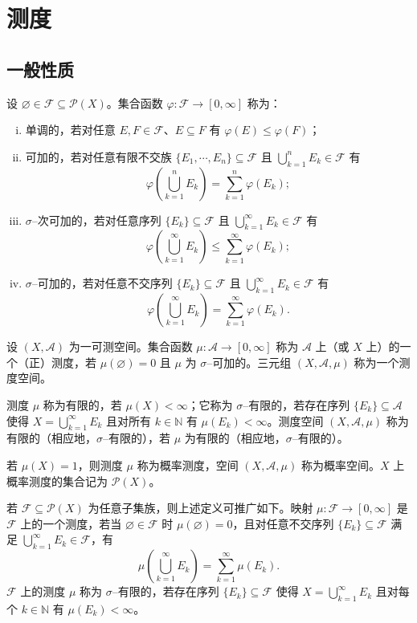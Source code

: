 \documentclass[../../main.tex]{subfiles}%
\begin{document}
\section{测度}\label{section:ch01-测度}

\subsection{一般性质}\label{subsection:ch01-测度一般性质}

\begin{definition}\label{definition:ch01-集合函数性质}
设 $\varnothing \in\mathcal{F}\subseteq\mathcal{P}(X)$。集合函数 $\varphi:\mathcal{F}\to[0,\infty]$ 称为：
\begin{enumerate}[(i)]
\item 单调的，若对任意 $E,F\in\mathcal{F}$、$E\subseteq F$ 有 $\varphi(E)\leqslant\varphi(F)$；
\item 可加的，若对任意有限不交族 $\{E_1,\cdots ,E_n\}\subseteq\mathcal{F}$ 且 $\bigcup_{k=1}^n E_k\in\mathcal{F}$ 有
\[
\varphi\left(\bigcup_{k=1}^n E_k\right)=\sum_{k=1}^n\varphi(E_k);
\]
\item $\sigma$--次可加的，若对任意序列 $\{E_k\}\subseteq\mathcal{F}$ 且 $\bigcup_{k=1}^\infty E_k\in\mathcal{F}$ 有
\[
\varphi\left(\bigcup_{k=1}^\infty E_k\right)\leqslant\sum_{k=1}^\infty\varphi(E_k);
\]
\item $\sigma$--可加的，若对任意不交序列 $\{E_k\}\subseteq\mathcal{F}$ 且 $\bigcup_{k=1}^\infty E_k\in\mathcal{F}$ 有
\[
\varphi\left(\bigcup_{k=1}^\infty E_k\right)=\sum_{k=1}^\infty\varphi(E_k).
\]
\end{enumerate}
\end{definition}

\begin{definition}\label{definition:ch01-测度}
设 $(X,\mathcal{A})$ 为一可测空间。集合函数 $\mu:\mathcal{A}\to[0,\infty]$ 称为 $\mathcal{A}$ 上（或 $X$ 上）的一个（正）测度，若 $\mu(\varnothing )=0$ 且 $\mu$ 为 $\sigma$--可加的。三元组 $(X,\mathcal{A},\mu)$ 称为一个测度空间。

测度 $\mu$ 称为有限的，若 $\mu(X)<\infty$；它称为 $\sigma$--有限的，若存在序列 $\{E_k\}\subseteq\mathcal{A}$ 使得 $X=\bigcup_{k=1}^\infty E_k$ 且对所有 $k\in\mathbb{N}$ 有 $\mu(E_k)<\infty$。测度空间 $(X,\mathcal{A},\mu)$ 称为有限的（相应地，$\sigma$--有限的），若 $\mu$ 为有限的（相应地，$\sigma$--有限的）。

若 $\mu(X)=1$，则测度 $\mu$ 称为概率测度，空间 $(X,\mathcal{A},\mu)$ 称为概率空间。$X$ 上概率测度的集合记为 $\mathcal{P}(X)$。

若 $\mathcal{F}\subseteq\mathcal{P}(X)$ 为任意子集族，则上述定义可推广如下。映射 $\mu:\mathcal{F}\to[0,\infty]$ 是 $\mathcal{F}$ 上的一个测度，若当 $\varnothing \in\mathcal{F}$ 时 $\mu(\varnothing )=0$，且对任意不交序列 $\{E_k\}\subseteq\mathcal{F}$ 满足 $\bigcup_{k=1}^\infty E_k\in\mathcal{F}$，有
\[
\mu\left(\bigcup_{k=1}^\infty E_k\right)=\sum_{k=1}^\infty\mu(E_k).
\]
$\mathcal{F}$ 上的测度 $\mu$ 称为 $\sigma$--有限的，若存在序列 $\{E_k\}\subseteq\mathcal{F}$ 使得 $X=\bigcup_{k=1}^\infty E_k$ 且对每个 $k\in\mathbb{N}$ 有 $\mu(E_k)<\infty$。
\end{definition}
\end{document}
